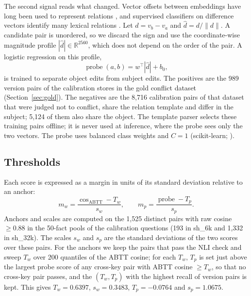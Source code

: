 \documentclass{CUP-JNL-NLP}
\newcommand{\sub}[1]{\textsf{sh\_#1}}                    %
\begin{document}
The second signal reads what changed. Vector offsets between embeddings have long been used to represent relations \citep{mikolov2013linguistic}, and supervised classifiers on difference vectors identify many lexical relations \citep{vylomova2016take}. Let $d=v_b-v_a$ and $\hat d=d/\lVert d\rVert$. A candidate pair is unordered, so we discard the sign and use the coordinate-wise magnitude profile $|\hat d|\in\mathbb{R}^{2560}$, which does not depend on the order of the pair. A logistic regression on this profile,
\begin{equation}
\operatorname{probe}(a,b)=w^{\top}|\hat d|+b_0,
\end{equation}
is trained to separate object edits from subject edits. The positives are the 989 version pairs of the calibration stores in the gold conflict dataset (Section~\ref{sec:gold}). The negatives are the 8,716 calibration pairs of that dataset that were judged not to conflict, share the relation template and differ in the subject; 5,124 of them also share the object. The template parser selects these training pairs offline; it is never used at inference, where the probe sees only the two vectors. The probe uses balanced class weights and $C=1$ (scikit-learn; \citealp{pedregosa2011sklearn}).

\subsection{Thresholds}
\label{sec:margins}

Each score is expressed as a margin in units of its standard deviation relative to an anchor:
\begin{equation}
m_w=\frac{\cos_{\mathrm{ABTT}}-T_w}{s_w},\qquad m_p=\frac{\operatorname{probe}-T_p}{s_p}.
\end{equation}
Anchors and scales are computed on the 1,525 distinct pairs with raw cosine $\ge0.88$ in the 50-fact pools of the calibration questions (193 in \sub{6k} and 1,332 in \sub{32k}). The scales $s_w$ and $s_p$ are the standard deviations of the two scores over these pairs. For the anchors we keep the pairs that pass the NLI check and sweep $T_w$ over 200 quantiles of the ABTT cosine; for each $T_w$, $T_p$ is set just above the largest probe score of any cross-key pair with ABTT cosine $\ge T_w$, so that no cross-key pair passes, and the $(T_w,T_p)$ with the highest recall of version pairs is kept. This gives $T_w=0.6397$, $s_w=0.3483$, $T_p=-0.0764$ and $s_p=1.0675$.
\end{document}
